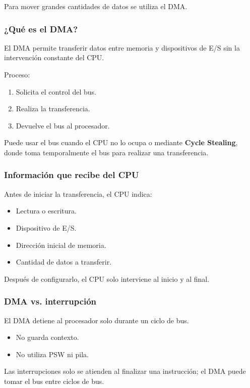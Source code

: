 \documentclass{article}
\begin{document}
Para mover grandes cantidades de datos se utiliza el DMA.

\subsubsection{¿Qué es el DMA?}
\label{sec:org3b45217}
El DMA permite transferir datos entre memoria y dispositivos de E/S sin la intervención constante del CPU.

Proceso:
\begin{enumerate}
\item Solicita el control del bus.
\item Realiza la transferencia.
\item Devuelve el bus al procesador.
\end{enumerate}

Puede usar el bus cuando el CPU no lo ocupa o mediante \textbf{\textbf{Cycle Stealing}}, donde toma temporalmente el bus para realizar una transferencia.

\subsubsection{Información que recibe del CPU}
\label{sec:orgbfcdea9}
Antes de iniciar la transferencia, el CPU indica:
\begin{itemize}
\item Lectura o escritura.
\item Dispositivo de E/S.
\item Dirección inicial de memoria.
\item Cantidad de datos a transferir.
\end{itemize}

Después de configurarlo, el CPU solo interviene al inicio y al final.

\subsubsection{DMA vs. interrupción}
\label{sec:org1088d1e}
El DMA detiene al procesador solo durante un ciclo de bus.

\begin{itemize}
\item No guarda contexto.
\item No utiliza PSW ni pila.
\end{itemize}

Las interrupciones solo se atienden al finalizar una instrucción; el DMA puede tomar el bus entre ciclos de bus.
\end{document}

